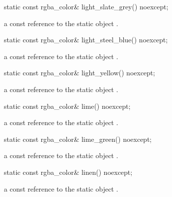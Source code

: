 \begin{itemdecl}
static const rgba_color& light_slate_grey() noexcept;
\end{itemdecl}
\begin{itemdescr}
\pnum
\returns
a const reference to the static  object .
\end{itemdescr}

\begin{itemdecl}
static const rgba_color& light_steel_blue() noexcept;
\end{itemdecl}
\begin{itemdescr}
\pnum
\returns
a const reference to the static  object .
\end{itemdescr}

\begin{itemdecl}
static const rgba_color& light_yellow() noexcept;
\end{itemdecl}
\begin{itemdescr}
\pnum
\returns
a const reference to the static  object .
\end{itemdescr}

\begin{itemdecl}
static const rgba_color& lime() noexcept;
\end{itemdecl}
\begin{itemdescr}
\pnum
\returns
a const reference to the static  object .
\end{itemdescr}

\begin{itemdecl}
static const rgba_color& lime_green() noexcept;
\end{itemdecl}
\begin{itemdescr}
\pnum
\returns
a const reference to the static  object .
\end{itemdescr}

\begin{itemdecl}
static const rgba_color& linen() noexcept;
\end{itemdecl}
\begin{itemdescr}
\pnum
\returns
a const reference to the static  object .
\end{itemdescr}

